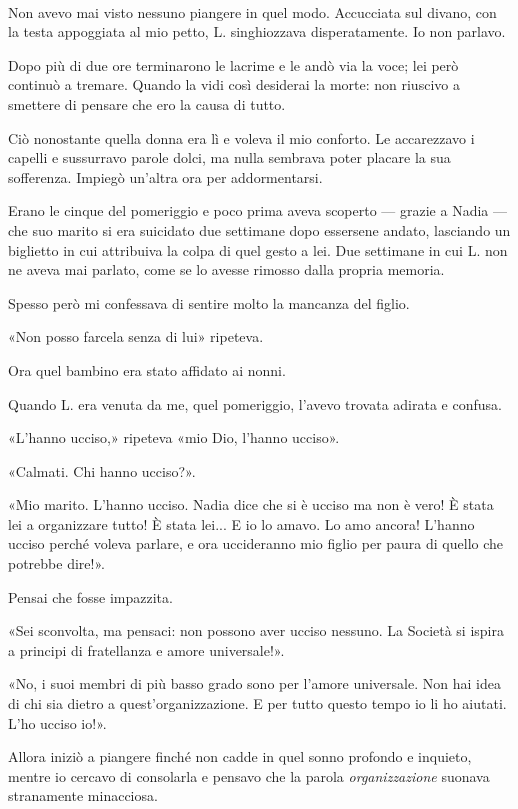 \documentclass[a4paper,12pt]{book}
\begin{document}
\paragraph{}
Non avevo mai visto nessuno piangere in quel modo. Accucciata sul divano, con la
testa appoggiata al mio petto, L. singhiozzava disperatamente. Io non parlavo.

Dopo più di due ore terminarono le lacrime e le andò via la voce; lei però
continuò a tremare. Quando la vidi così desiderai la morte: non riuscivo a
smettere di pensare che ero la causa di tutto.

Ciò nonostante quella donna era lì e voleva il mio conforto. Le accarezzavo i
capelli e sussurravo parole dolci, ma nulla sembrava poter placare la sua
sofferenza. Impiegò un'altra ora per addormentarsi.

Erano le cinque del pomeriggio e poco prima aveva scoperto --- grazie a Nadia
--- che suo marito si era suicidato due settimane dopo essersene andato,
lasciando un biglietto in cui attribuiva la colpa di quel gesto a lei. Due
settimane in cui L. non ne aveva mai parlato, come se lo avesse rimosso dalla
propria memoria.

Spesso però mi confessava di sentire molto la mancanza del figlio.

«Non posso farcela senza di lui» ripeteva.

Ora quel bambino era stato affidato ai nonni.

Quando L. era venuta da me, quel pomeriggio, l'avevo trovata adirata e confusa.

«L'hanno ucciso,» ripeteva «mio Dio, l'hanno ucciso».

«Calmati. Chi hanno ucciso?».

«Mio marito. L'hanno ucciso. Nadia dice che si è ucciso ma non è vero! È stata
lei a organizzare tutto! È stata lei... E io lo amavo. Lo amo ancora! L'hanno
ucciso perché voleva parlare, e ora uccideranno mio figlio per paura di quello
che potrebbe dire!».

Pensai che fosse impazzita.

«Sei sconvolta, ma pensaci: non possono aver ucciso nessuno. La Società si
ispira a principi di fratellanza e amore universale!».

«No, i suoi membri di più basso grado sono per l'amore universale. Non hai idea
di chi sia dietro a quest'organizzazione. E per tutto questo tempo io li ho
aiutati. L'ho ucciso io!».

Allora iniziò a piangere finché non cadde in quel sonno profondo e inquieto,
mentre io cercavo di consolarla e pensavo che la parola \emph{organizzazione}
suonava stranamente minacciosa.
\end{document}
